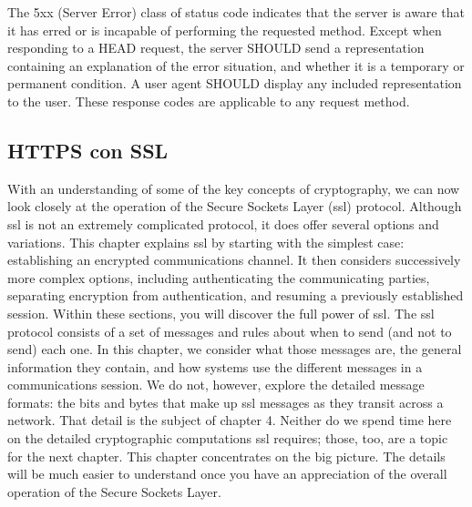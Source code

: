    The 5xx (Server Error) class of status code indicates that the server
   is aware that it has erred or is incapable of performing the
   requested method.  Except when responding to a HEAD request, the
   server SHOULD send a representation containing an explanation of the
   error situation, and whether it is a temporary or permanent   condition.  A user agent SHOULD display any included representation
   to the user.  These response codes are applicable to any request
   method.

  

\subsection{HTTPS con SSL} 

With an understanding of some of the key concepts of cryptography,
we can now look closely at the operation of the Secure Sockets Layer
(ssl) protocol. Although ssl is not an extremely complicated protocol, it does offer several options and variations. This chapter explains
ssl by starting with the simplest case: establishing an encrypted
communications channel. It then considers successively more complex options, including authenticating the communicating parties,
separating encryption from authentication, and resuming a previously
established session. Within these sections, you will discover the full
power of ssl.
The ssl protocol consists of a set of messages and rules about when
to send (and not to send) each one. In this chapter, we consider what
those messages are, the general information they contain, and how
systems use the different messages in a communications session. We
do not, however, explore the detailed message formats: the bits and
bytes that make up ssl messages as they transit across a network.
That detail is the subject of chapter 4. Neither do we spend time here
on the detailed cryptographic computations ssl requires; those, too,
are a topic for the next chapter. This chapter concentrates on the big
picture. The details will be much easier to understand once you have
an appreciation of the overall operation of the Secure Sockets Layer.

